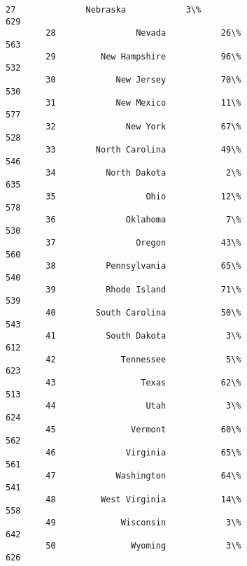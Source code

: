\documentclass[11pt]{article}
\begin{document}
\begin{Verbatim}[commandchars=\\\{\}]
        27              Nebraska            3\%                                 629   
        28                Nevada           26\%                                 563   
        29         New Hampshire           96\%                                 532   
        30            New Jersey           70\%                                 530   
        31            New Mexico           11\%                                 577   
        32              New York           67\%                                 528   
        33        North Carolina           49\%                                 546   
        34          North Dakota            2\%                                 635   
        35                  Ohio           12\%                                 578   
        36              Oklahoma            7\%                                 530   
        37                Oregon           43\%                                 560   
        38          Pennsylvania           65\%                                 540   
        39          Rhode Island           71\%                                 539   
        40        South Carolina           50\%                                 543   
        41          South Dakota            3\%                                 612   
        42             Tennessee            5\%                                 623   
        43                 Texas           62\%                                 513   
        44                  Utah            3\%                                 624   
        45               Vermont           60\%                                 562   
        46              Virginia           65\%                                 561   
        47            Washington           64\%                                 541   
        48         West Virginia           14\%                                 558   
        49             Wisconsin            3\%                                 642   
        50               Wyoming            3\%                                 626   
        

\end{Verbatim}
\end{document}
